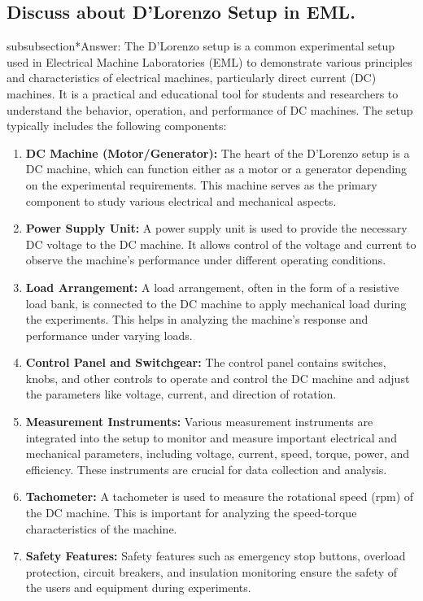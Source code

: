 \documentclass[12pt]{article}
\begin{document}
\vspace{0.5cm}
\subsection{Discuss about D'Lorenzo Setup in EML.}
subsubsection*{Answer:}
The D'Lorenzo setup is a common experimental setup used in Electrical Machine Laboratories (EML) to demonstrate various principles and characteristics of electrical machines, particularly direct current (DC) machines. It is a practical and educational tool for students and researchers to understand the behavior, operation, and performance of DC machines. The setup typically includes the following components:
\begin{enumerate}
    \item \textbf{DC Machine (Motor/Generator): } The heart of the D'Lorenzo setup is a DC machine, which can function either as a motor or a generator depending on the experimental requirements. This machine serves as the primary component to study various electrical and mechanical aspects.
    \item \textbf{Power Supply Unit: } A power supply unit is used to provide the necessary DC voltage to the DC machine. It allows control of the voltage and current to observe the machine's performance under different operating conditions.
    \item \textbf{Load Arrangement: } A load arrangement, often in the form of a resistive load bank, is connected to the DC machine to apply mechanical load during the experiments. This helps in analyzing the machine's response and performance under varying loads.
    \item \textbf{Control Panel and Switchgear: } The control panel contains switches, knobs, and other controls to operate and control the DC machine and adjust the parameters like voltage, current, and direction of rotation.
    \item \textbf{Measurement Instruments: } Various measurement instruments are integrated into the setup to monitor and measure important electrical and mechanical parameters, including voltage, current, speed, torque, power, and efficiency. These instruments are crucial for data collection and analysis.
    \item \textbf{Tachometer: } A tachometer is used to measure the rotational speed (rpm) of the DC machine. This is important for analyzing the speed-torque characteristics of the machine.
    \item \textbf{Safety Features: } Safety features such as emergency stop buttons, overload protection, circuit breakers, and insulation monitoring ensure the safety of the users and equipment during experiments.

\end{enumerate}
\end{document}
